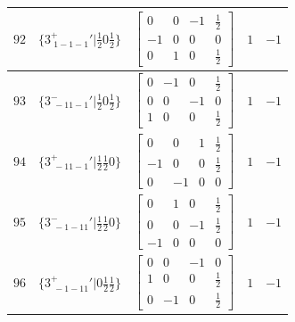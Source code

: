 \documentclass[fleqn,8pt]{jsarticle}
\begin{document}
\begin{longtable}{ccccc}
$ 92 $ & $ \{3^{+}_{\,\,1-1-1}{}'|\frac{1}{2} 0 \frac{1}{2}\} $ & $ \begin{bmatrix} 0 & 0 & -1 & \frac{1}{2} \\ -1 & 0 & 0 & 0 \\ 0 & 1 & 0 & \frac{1}{2} \end{bmatrix} $ & $ 1 $ & $ -1 $ \\ \hline
$ 93 $ & $ \{3^{-}_{\,\,-11-1}{}'|\frac{1}{2} 0 \frac{1}{2}\} $ & $ \begin{bmatrix} 0 & -1 & 0 & \frac{1}{2} \\ 0 & 0 & -1 & 0 \\ 1 & 0 & 0 & \frac{1}{2} \end{bmatrix} $ & $ 1 $ & $ -1 $ \\ \hline
$ 94 $ & $ \{3^{+}_{\,\,-11-1}{}'|\frac{1}{2} \frac{1}{2} 0\} $ & $ \begin{bmatrix} 0 & 0 & 1 & \frac{1}{2} \\ -1 & 0 & 0 & \frac{1}{2} \\ 0 & -1 & 0 & 0 \end{bmatrix} $ & $ 1 $ & $ -1 $ \\ \hline
$ 95 $ & $ \{3^{-}_{\,\,-1-11}{}'|\frac{1}{2} \frac{1}{2} 0\} $ & $ \begin{bmatrix} 0 & 1 & 0 & \frac{1}{2} \\ 0 & 0 & -1 & \frac{1}{2} \\ -1 & 0 & 0 & 0 \end{bmatrix} $ & $ 1 $ & $ -1 $ \\ \hline
$ 96 $ & $ \{3^{+}_{\,\,-1-11}{}'|0 \frac{1}{2} \frac{1}{2}\} $ & $ \begin{bmatrix} 0 & 0 & -1 & 0 \\ 1 & 0 & 0 & \frac{1}{2} \\ 0 & -1 & 0 & \frac{1}{2} \end{bmatrix} $ & $ 1 $ & $ -1 $ \\
\end{longtable}
\end{document}
